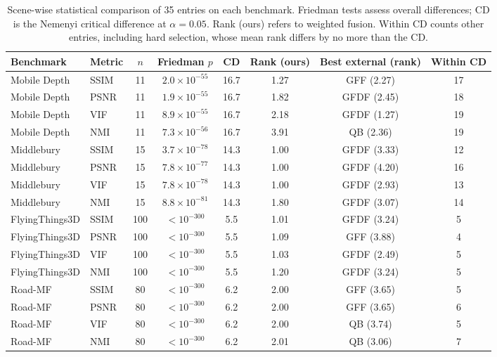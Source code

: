\begin{table}[t]
\centering
\scriptsize
\setlength{\tabcolsep}{3pt}
\caption{Scene-wise statistical comparison of 35 entries on each benchmark. Friedman tests assess overall differences; CD is the Nemenyi critical difference at $\alpha=0.05$. Rank (ours) refers to weighted fusion. Within CD counts other entries, including hard selection, whose mean rank differs by no more than the CD.}
\label{tab:stats}
\begin{tabular}{llcccccc}
\toprule
Benchmark & Metric & $n$ & Friedman $p$ & CD & Rank (ours) & Best external (rank) & Within CD \\
\midrule
Mobile Depth & SSIM & 11 & $2.0\times10^{-55}$ & 16.7 & 1.27 & GFF (2.27) & 17 \\
Mobile Depth & PSNR & 11 & $1.9\times10^{-55}$ & 16.7 & 1.82 & GFDF (2.45) & 18 \\
Mobile Depth & VIF & 11 & $8.9\times10^{-55}$ & 16.7 & 2.18 & GFDF (1.27) & 19 \\
Mobile Depth & NMI & 11 & $7.3\times10^{-56}$ & 16.7 & 3.91 & QB (2.36) & 19 \\
Middlebury & SSIM & 15 & $3.7\times10^{-78}$ & 14.3 & 1.00 & GFDF (3.33) & 12 \\
Middlebury & PSNR & 15 & $7.8\times10^{-77}$ & 14.3 & 1.00 & GFDF (4.20) & 16 \\
Middlebury & VIF & 15 & $7.8\times10^{-78}$ & 14.3 & 1.00 & GFDF (2.93) & 13 \\
Middlebury & NMI & 15 & $8.8\times10^{-81}$ & 14.3 & 1.80 & GFDF (3.07) & 14 \\
FlyingThings3D & SSIM & 100 & $<10^{-300}$ & 5.5 & 1.01 & GFDF (3.24) & 5 \\
FlyingThings3D & PSNR & 100 & $<10^{-300}$ & 5.5 & 1.09 & GFF (3.88) & 4 \\
FlyingThings3D & VIF & 100 & $<10^{-300}$ & 5.5 & 1.03 & GFDF (2.49) & 5 \\
FlyingThings3D & NMI & 100 & $<10^{-300}$ & 5.5 & 1.20 & GFDF (3.24) & 5 \\
Road-MF & SSIM & 80 & $<10^{-300}$ & 6.2 & 2.00 & GFF (3.65) & 5 \\
Road-MF & PSNR & 80 & $<10^{-300}$ & 6.2 & 2.00 & GFF (3.65) & 6 \\
Road-MF & VIF & 80 & $<10^{-300}$ & 6.2 & 2.00 & QB (3.74) & 5 \\
Road-MF & NMI & 80 & $<10^{-300}$ & 6.2 & 2.01 & QB (3.06) & 7 \\
\bottomrule
\end{tabular}
\end{table}
